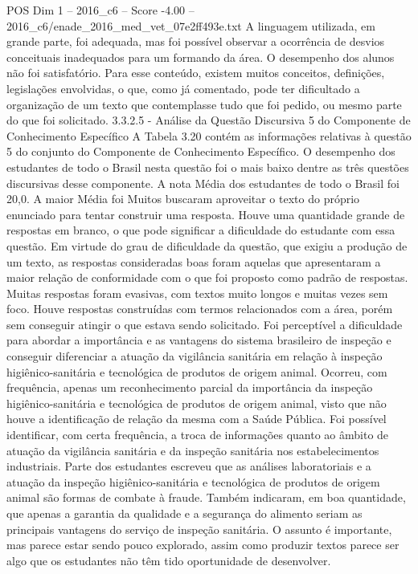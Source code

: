\begin{textsample}{POS Dim 1 – 2016\_c6 – Score -4.00 – 2016\_c6/enade\_2016\_med\_vet\_07e2ff493e.txt}
A linguagem utilizada, em grande parte, foi adequada, mas foi possível observar a ocorrência de desvios conceituais inadequados para um formando da área.
O desempenho dos alunos não foi satisfatório.
Para esse conteúdo, existem muitos conceitos, definições, legislações envolvidas, o que, como já comentado, pode ter dificultado a organização de um texto que contemplasse tudo que foi pedido, ou mesmo parte do que foi solicitado. 3.3.2.5 - Análise da Questão Discursiva 5 do Componente de Conhecimento Específico A Tabela 3.20 contém as informações relativas à questão 5 do conjunto do Componente de Conhecimento Específico.
O desempenho dos estudantes de todo o Brasil nesta questão foi o mais baixo dentre as três questões discursivas desse componente.
A nota Média dos estudantes de todo o Brasil foi 20,0.
A maior Média foi Muitos buscaram aproveitar o texto do próprio enunciado para tentar construir uma resposta.
Houve uma quantidade grande de respostas em branco, o que pode significar a dificuldade do estudante com essa questão.
Em virtude do grau de dificuldade da questão, que exigiu a produção de um texto, as respostas consideradas boas foram aquelas que apresentaram a maior relação de conformidade com o que foi proposto como padrão de respostas.
Muitas respostas foram evasivas, com textos muito longos e muitas vezes sem foco.
Houve respostas construídas com termos relacionados com a área, porém sem conseguir atingir o que estava sendo solicitado.
Foi perceptível a dificuldade para abordar a importância e as vantagens do sistema brasileiro de inspeção e conseguir diferenciar a atuação da vigilância sanitária em relação à inspeção higiênico-sanitária e tecnológica de produtos de origem animal.
Ocorreu, com frequência, apenas um reconhecimento parcial da importância da inspeção higiênico-sanitária e tecnológica de produtos de origem animal, visto que não houve a identificação de relação da mesma com a Saúde Pública.
Foi possível identificar, com certa frequência, a troca de informações quanto ao âmbito de atuação da vigilância sanitária e da inspeção sanitária nos estabelecimentos industriais.
Parte dos estudantes escreveu que as análises laboratoriais e a atuação da inspeção higiênico-sanitária e tecnológica de produtos de origem animal são formas de combate à fraude.
Também indicaram, em boa quantidade, que apenas a garantia da qualidade e a segurança do alimento seriam as principais vantagens do serviço de inspeção sanitária.
O assunto é importante, mas parece estar sendo pouco explorado, assim como produzir textos parece ser algo que os estudantes não têm tido oportunidade de desenvolver.

\end{textsample}
